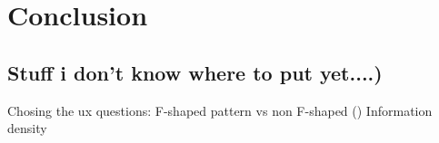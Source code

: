 
\chapter{Conclusion} %

\label{Chapter9} %


\section{Stuff i don't know where to put yet....)}
Chosing the ux questions:
F-shaped pattern vs non F-shaped (\cite{cross_web})
Information density